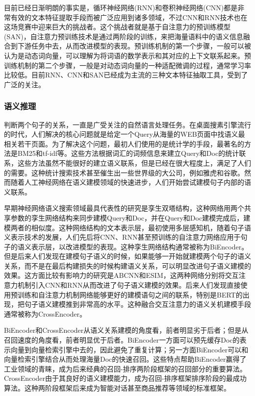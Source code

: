 \documentclass[twoside,a4paper,12pt]{book}%
\begin{document}
目前已经日渐明朗的事实是，循环神经网络(\gls{RNN})和卷积神经网络(\gls{CNN})都是非常有效的文本特征提取手段而被广泛应用到诸多领域，不过\gls{CNN}和\gls{RNN}技术也在这场竞赛中迎来巨大的挑战者。这个挑战者就是基于自注意力的预训练模型(\gls{SAN})，自注意力预训练技术是通过两阶段的训练，来把海量语料中的语义信息融合到下游任务中去，从而改进模型的表现。预训练机制的第一个步骤，一般可以被认为是动态词向量，可以理解为将词语的数学表示和其对应的上下文联系起来。预训练机制的第二个步骤，一般是对动态词向量的一种适配微调的过程，通常学习率比较低。目前\gls{RNN}、\gls{CNN}和\gls{SAN}已经成为主流的三种文本特征抽取工具，受到了广泛的关注。

\subsubsection{语义推理}
判断两个句子的关系，一直是广受关注的自然语言处理任务。在桌面搜素引擎流行的时代，人们解决的核心问题就是给定一个Query从海量的WEB页面中找语义最相关若干页面。为了解决这个问题，最初人们使用的是统计学的手段，最著名的方法是BM25和tf-idf等。这些方法根据词汇的词频信息来建立Query和Doc的统计联系，这些方法虽然不能很好的建立语义联系，但是已经在很大程度上，满足了人们的需要。这种统计搜索技术甚至催生出一些世界级的大公司，例如雅虎和谷歌。然而随着人工神经网络在语义建模领域的快速进步，人们开始尝试建模句子内部的语义联系。

早期神经网络语义搜索领域最具代表性的研究是孪生双塔结构，这种网络用两个共享参数的孪生网络结构来同步建模Query和Doc，并在Query和Doc建模完成后，建模两者的相似度。这种网络结构的文本表示层，最初使用多层感知机，随着句子语义表示技术的发展，人们先后将\gls{CNN}、\gls{RNN}甚至预训练的自注意力网络应用于句子的语义表示层，以改进模型的表现。这种孪生网络结构通常被称为BiEncoder。但是后来人们发现在建模句子语义的时候，如果能够一开始就建模两个句子的语义关系，而不是在最后构建损失的时候构建语义关系，可以明显改进句子语义建模的效果。这方面比较有影响力的研究是ABCNN和ESIM，这两种网络分别将交互注意力机制引入\gls{CNN}和\gls{RNN}从而改进了句子语义建模的效果。后来人们发现直接使用预训练和自注意力机制网络能够更好的建模语句之间的联系，特别是\gls{BERT}的出现，把句子语义建模推到非常高的水平。这种融合交互注意力的语义关机建模手段
通常被称为CrossEncoder。

BiEncoder和CrossEncoder从语义关系建模的角度看，前者明显劣于后者；但是从召回速度的角度看，前者明显优于后者。BiEncoder一方面可以预先缓存Doc的表示向量到向量检索引擎中去的，因此避免了重复计算；另一方面BiEncoder可以和向量检索引擎结合从而处理海量Doc的快速召回。这些特点帮助BiEncoder赢得了工业领域的青睐，成为后来经典的召回-排序两阶段框架的召回部分的重要算法。CrossEncoder由于其良好的语义建模能力，成为召回-排序框架排序阶段的最成功算法。这种两阶段框架后来成为智能对话甚至商品推荐等领域的标准框架。
\end{document}
